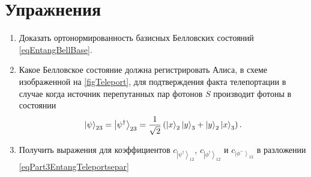 %













\section{Упражнения}
\begin{enumerate}
\item Доказать ортонормированность базисных Белловских состояний
  \eqref{eqEntangBellBase}. 
\item Какое Белловское состояние должна регистрировать Алиса, в схеме
  изображенной на \autoref{figTeleport}, для
  подтверждения факта телепортации в случае когда источник
  перепутанных пар фотонов $S$ производит фотоны в состоянии 
\begin{equation}
  \left|\psi\right>_{23} = \left|\psi^{\dag}\right>_{23} = \frac{1}{\sqrt{2}}\left(
  \ket{x}_2\ket{y}_3 +
  \ket{y}_2\ket{x}_3
  \right).
  \nonumber
\end{equation}
\item Получить выражения для коэффициентов 
$c_{\left|\psi^{\dag}\right>_{12}}$, 
$c_{\left|\phi^{\dag}\right>_{12}}$ и 
$c_{\left|\phi^{-}\right>_{12}}$
в разложении \eqref{eqPart3EntangTeleportsepar}
\end{enumerate}
